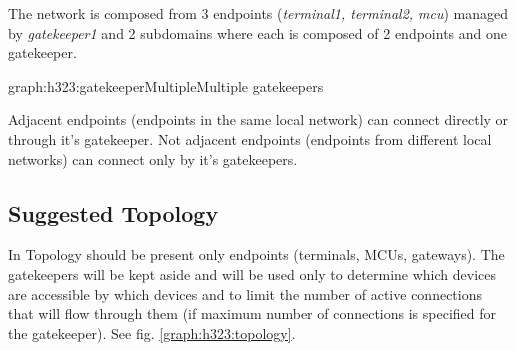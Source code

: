 \documentclass[a4paper]{report}
\begin{document}
The network is composed from 3 endpoints (\emph{terminal1, terminal2, mcu}) managed by \emph{gatekeeper1} and 2 subdomains where each is composed of 2 endpoints and one gatekeeper.%
\begin{Graph}{graph:h323:gatekeeperMultiple}{Multiple gatekeepers}
  

     
  

\end{Graph}%
Adjacent endpoints (endpoints in the same local network) can connect directly or through it's gatekeeper. Not adjacent endpoints (endpoints from different local networks) can connect only by it's gatekeepers.

\subsection{Suggested Topology}
In Topology should be present only endpoints (terminals, MCUs, gateways). The gatekeepers will be kept aside and will be used only to determine which devices are accessible by which devices and to limit the number of active connections that will flow through them (if maximum number of connections is specified for the gatekeeper). See fig. \ref{graph:h323:topology}.
\end{document}
